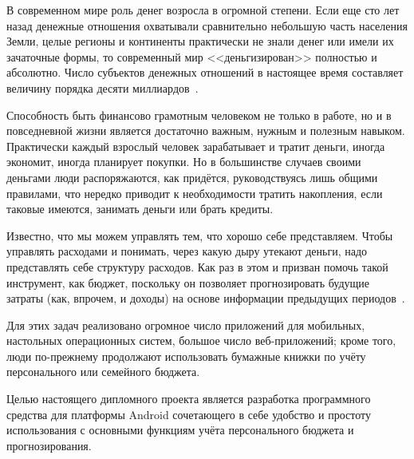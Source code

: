 \label{sec:introduction}

В современном мире роль денег возросла в огромной степени. 
Если еще сто лет назад денежные отношения охватывали сравнительно небольшую часть населения Земли, целые регионы и континенты практически не знали денег или имели их зачаточные формы, то современный мир <<деньгизирован>> полностью и абсолютно. 
Число субъектов денежных отношений в настоящее время составляет величину порядка десяти миллиардов~\cite{money_sorgin}.

Способность быть финансово грамотным человеком не только в работе, но и в повседневной жизни является достаточно важным, нужным и полезным навыком.
Практически каждый взрослый человек зарабатывает и тратит деньги, иногда экономит, иногда планирует покупки.
Но в большинстве случаев своими деньгами люди распоряжаются, как придётся, руководствуясь лишь общими правилами, что нередко приводит к необходимости тратить накопления, если таковые имеются, занимать деньги или брать кредиты. 

Известно, что мы можем управлять тем, что хорошо себе представляем. 
Чтобы управлять расходами и понимать, через какую дыру утекают деньги, надо представлять себе структуру расходов. 
Как раз в этом и призван помочь такой инструмент, как бюджет, поскольку он позволяет прогнозировать будущие затраты (как, впрочем, и доходы) на основе информации предыдущих периодов~\cite{money_under_control}.


Для этих задач реализовано огромное число приложений для мобильных, настольных операционных систем, большое число  веб-приложений; кроме того, люди по-прежнему продолжают использовать бумажные книжки по учёту персонального или семейного бюджета.

Целью настоящего дипломного проекта является разработка программного средства для платформы Android сочетающего в себе удобство и простоту использования с основными функциям учёта персонального бюджета и прогнозирования.

